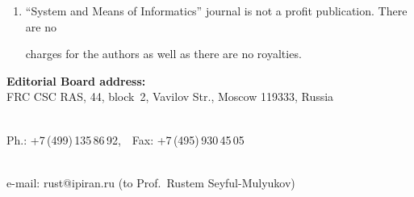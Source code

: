 {{\begin{enumerate}[1.]
\begin{itemize}
\item   an electronic version of the article should contain the file with the text and a~separate file


with figures.\\[-14pt]


\end{itemize}





\item ``System and Means of Informatics'' journal is not a profit publication. There are no


charges for the authors as well as there are no royalties.\\[-13.5pt]


\end{enumerate}





\thispagestyle{empty}
















\begin{center}


\textbf{Editorial Board address:} \\











FRC CSC RAS, 44, block~2, Vavilov Str., Moscow 119333, Russia \\[-8pt]





\





Ph.: +7\,(499)\,135\,86\,92,\ \ Fax: +7\,(495)\,930\,45\,05\\[-8pt]





\





 e-mail: {\sf rust@ipiran.ru} (to Prof.\ Rustem Seyful-Mulyukov)\\[-8pt]






\end{center}}}
